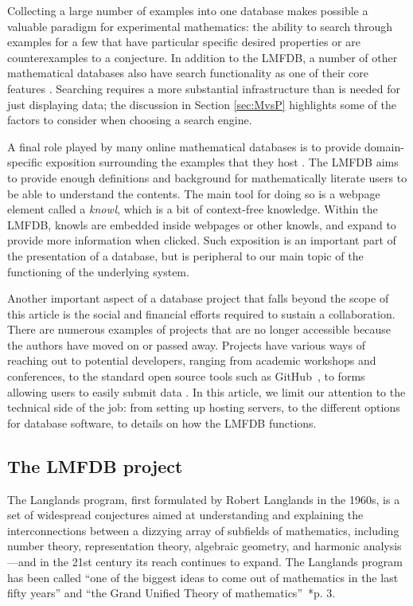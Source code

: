 \documentclass{amsart}
\begin{document}
Collecting a large number of examples into one database makes possible a valuable paradigm for experimental mathematics: the ability to search through examples for a few that have particular specific desired properties or are counterexamples to a conjecture.
In addition to the LMFDB, a number of other mathematical databases also have search functionality as one of their core features \cites{umrk, findstat, oeis, isc, cydata, hog, knotinfo}.
Searching requires a more substantial infrastructure than is needed for just displaying data; the discussion in Section \ref{sec:MvsP} highlights some of the factors to consider when choosing a search engine.

A final role played by many online mathematical databases is to provide domain-specific exposition surrounding the examples that they host \cites{primepages, graphclasses, complexityzoo, cantorsattic, findstat, knotinfo, groupnames}.
The LMFDB aims to provide enough definitions and background for mathematically literate users to be able to understand the contents.
The main tool for doing so is a webpage element called a \emph{knowl}, which is a bit of context-free knowledge.
Within the LMFDB, knowls are embedded inside webpages or other knowls, and expand to provide more information when clicked.
Such exposition is an important part of the presentation of a database, but is peripheral to our main topic of the functioning of the underlying system.

Another important aspect of a database project that falls beyond the scope of this article is the social and financial efforts required to sustain a collaboration.
There are numerous examples of projects that are no longer accessible because the authors have moved on or passed away.
Projects have various ways of reaching out to potential developers, ranging from academic workshops and conferences, to the standard open source tools such as GitHub~\cite{github}, to forms allowing users to easily submit data \cites{findstat, hog, oeis}.
In this article, we limit our attention to the technical side of the job: from setting up hosting servers, to the different options for database software, to details on how the LMFDB functions.

\subsection{The LMFDB project}
The Langlands program, first formulated by Robert Langlands in the 1960s, is a set of widespread conjectures aimed at understanding and explaining the interconnections between a dizzying array of subfields of mathematics, including number theory, representation theory, algebraic geometry, and harmonic analysis---and in the 21st century its reach continues to expand.
The Langlands program has been called ``one of the biggest ideas to come out of mathematics in the last fifty years'' and ``the Grand Unified Theory of mathematics''~\cite{frenkel}*{p. 3}.
\end{document}
